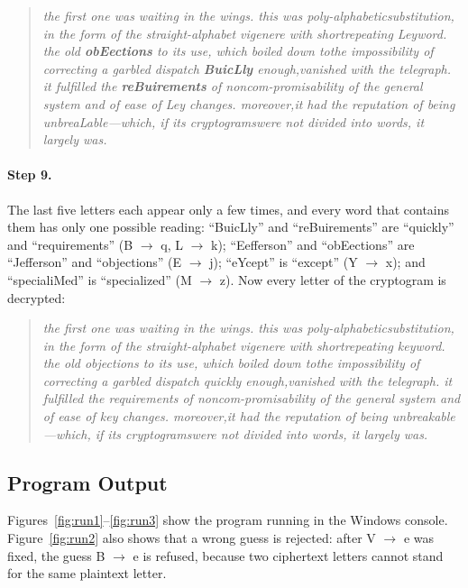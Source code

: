 \documentclass[12pt,a4paper]{article}
\newenvironment{cryptotext}{\begin{quote}\raggedright\itshape\small}{\end{quote}}
\begin{document}
\begin{cryptotext}
the first one was waiting in the wings. this was poly-alphabeticsubstitution, in the form of the straight-alphabet vigenere with shortrepeating Leyword. the old \textbf{obEections} to its use, which boiled down tothe impossibility of correcting a garbled dispatch \textbf{BuicLly} enough,vanished with the telegraph. it fulfilled the \textbf{reBuirements} of noncom-promisability of the general system and of ease of Ley changes. moreover,it had the reputation of being unbreaLable---which, if its cryptogramswere not divided into words, it largely was.
\end{cryptotext}

\paragraph{Step 9.} The last five letters each appear only a few times, and every word
that contains them has only one possible reading: ``BuicLly'' and ``reBuirements'' are
``quickly'' and ``requirements'' (B $\rightarrow$ q, L $\rightarrow$ k); ``Eefferson'' and
``obEections'' are ``Jefferson'' and ``objections'' (E $\rightarrow$ j); ``eYcept'' is
``except'' (Y $\rightarrow$ x); and ``specialiMed'' is ``specialized'' (M $\rightarrow$ z).
Now every letter of the cryptogram is decrypted:

\begin{cryptotext}
the first one was waiting in the wings. this was poly-alphabeticsubstitution, in the form of the straight-alphabet vigenere with shortrepeating keyword. the old objections to its use, which boiled down tothe impossibility of correcting a garbled dispatch quickly enough,vanished with the telegraph. it fulfilled the requirements of noncom-promisability of the general system and of ease of key changes. moreover,it had the reputation of being unbreakable---which, if its cryptogramswere not divided into words, it largely was.
\end{cryptotext}

\subsection{Program Output}

Figures~\ref{fig:run1}--\ref{fig:run3} show the program running in the Windows console.
Figure~\ref{fig:run2} also shows that a wrong guess is rejected: after V $\rightarrow$ e
was fixed, the guess B $\rightarrow$ e is refused, because two ciphertext letters cannot
stand for the same plaintext letter.
\end{document}
